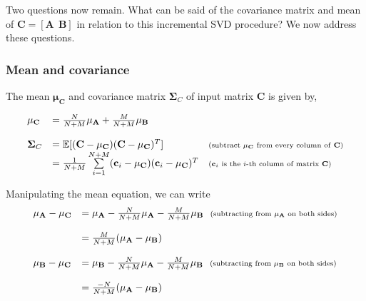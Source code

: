 Two questions now remain.  What can be said of the covariance matrix and mean of $\mathbf{C} = \left[{\mathbf{A}} \ \ \mathbf{B}\right]$ in relation to this incremental SVD procedure?  We now address these questions.


\subsubsection{Mean and covariance}
The mean $\mathbf{\mu}_\mathbf{C}$ and covariance matrix $\mathbf{\Sigma}_C$ of input matrix $\mathbf{C}$ is given by,

\begin{equation}
\begin{array}{llll}
\mathbf{\mu}_\mathbf{C} &= \frac{N}{N+M}\mathbf{\mu}_\mathbf{A} + \frac{M}{N+M}\mathbf{\mu}_\mathbf{B}\\\\
\mathbf{\Sigma}_C &= \mathbb{E}[(\mathbf{C}-\mathbf{\mu}_\mathbf{C})(\mathbf{C}-\mu_\mathbf{C})^T] & \textrm{\scriptsize (subtract $\mathbf{\mu}_\mathbf{C}$ from every column of \textbf{C})}\\
&=\frac{1}{N+M}\sum\limits_{i=1}^{N+M} (\mathbf{c}_i-\mathbf{\mu}_\mathbf{C})(\mathbf{c}_i-\mu_\mathbf{C})^T & \textrm{\scriptsize ($\mathbf{c}_i$ is the $i$-th column of matrix $\mathbf{C}$)}\\
\end{array}
\end{equation}

Manipulating the mean equation, we can write
\begin{equation}
\begin{array}{llll}
\mathbf{\mu}_\mathbf{A} -\mathbf{\mu}_\mathbf{C} &= \mathbf{\mu}_\mathbf{A} - \frac{N}{N+M}\mathbf{\mu}_\mathbf{A} - \frac{M}{N+M}\mathbf{\mu}_\mathbf{B} \ \ \scriptsize{\textrm{(subtracting from $\mathbf{\mu}_\mathbf{A}$ on both sides)}}\\\\

&=\frac{M}{N+M}(\mathbf{\mu}_\mathbf{A} - \mathbf{\mu}_\mathbf{B})\\\\

\mathbf{\mu}_\mathbf{B} -\mathbf{\mu}_\mathbf{C} &= \mathbf{\mu}_\mathbf{B} - \frac{N}{N+M}\mathbf{\mu}_\mathbf{A} - \frac{M}{N+M}\mathbf{\mu}_\mathbf{B} \ \ \scriptsize{\textrm{(subtracting from $\mathbf{\mu}_\mathbf{B}$ on both sides)}}\\\\

&=\frac{-N}{N+M}(\mathbf{\mu}_\mathbf{A} - \mathbf{\mu}_\mathbf{B})
\end{array}
\end{equation}


